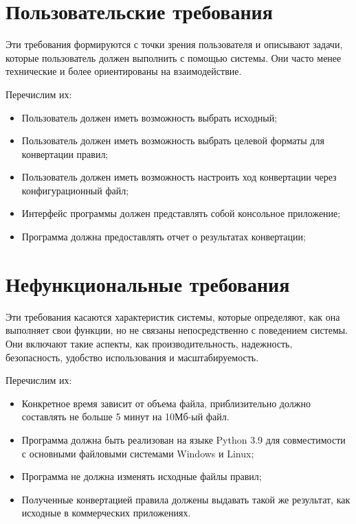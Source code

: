 \section{Пользовательские требования}

Эти требования формируются с точки зрения пользователя и описывают задачи,
которые пользователь должен выполнить с помощью системы.
Они часто менее технические и более ориентированы на взаимодействие.

Перечислим их:

\begin{itemize}
    \item Пользователь должен иметь возможность выбрать исходный;
    \item Пользователь должен иметь возможность выбрать
		целевой форматы для конвертации правил;
    \item Пользователь должен иметь возможность настроить ход конвертации
		через конфигурационный файл;
    \item Интерфейс программы должен представлять собой консольное приложение;
    \item Программа должна предоставлять отчет о результатах конвертации;
\end{itemize}

\section{Нефункциональные требования}

Эти требования касаются характеристик системы, которые определяют,
как она выполняет свои функции,
но не связаны непосредственно с поведением системы.
Они включают такие аспекты, как производительность, надежность, безопасность,
удобство использования и масштабируемость.

Перечислим их:

\begin{itemize}
	\item Конкретное время зависит от объема файла,
		приблизительно должно составлять не больше 5 минут на 10Мб-ый файл.
    \item Программа должна быть реализован на языке Python 3.9
		для совместимости с основными файловыми системами Windows и Linux;
    \item Программа не должна изменять исходные файлы правил;
    \item Полученные конвертацией правила должены выдавать
		такой же результат, как исходные в коммерческих приложениях.
\end{itemize}

